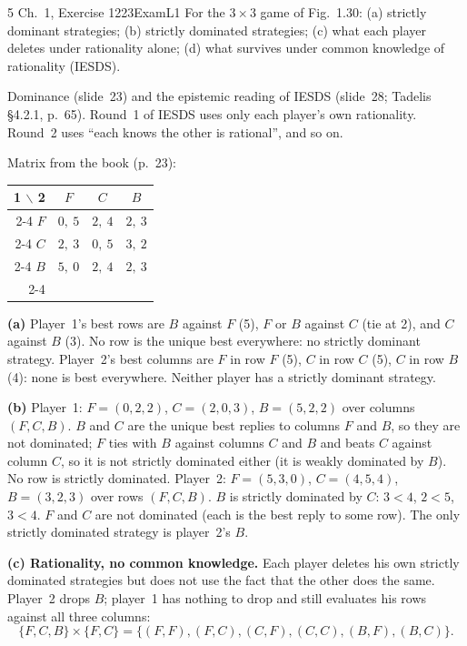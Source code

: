 \begin{exsol}{5}{\MG{} Ch.~1, Exercise 12}{23}{Exam}{L1}
\asked For the $3 \times 3$ game of Fig.~1.30: (a) strictly dominant strategies; (b) strictly
dominated strategies; (c) what each player deletes under rationality alone; (d) what survives
under common knowledge of rationality (IESDS).

\method Dominance (slide~23) and the epistemic reading of IESDS (slide~28; Tadelis \S4.2.1,
p.~65). Round~1 of IESDS uses only each player's own rationality. Round~2 uses ``each knows the
other is rational'', and so on.

\solution
Matrix from the book (p.~23):
\begin{center}
\begin{tabular}{r|c|c|c|}
\multicolumn{1}{r}{1 $\backslash$ 2} & \multicolumn{1}{c}{$F$} & \multicolumn{1}{c}{$C$} & \multicolumn{1}{c}{$B$}\\ \cline{2-4}
$F$ & $0,\ 5$ & $2,\ 4$ & $2,\ 3$ \\ \cline{2-4}
$C$ & $2,\ 3$ & $0,\ 5$ & $3,\ 2$ \\ \cline{2-4}
$B$ & $5,\ 0$ & $2,\ 4$ & $2,\ 3$ \\ \cline{2-4}
\end{tabular}
\end{center}

\textbf{(a)} Player~1's best rows are $B$ against $F$ (5), $F$ or $B$ against $C$ (tie at 2),
and $C$ against $B$ (3). No row is the unique best everywhere: no strictly dominant strategy.
Player~2's best columns are $F$ in row $F$ (5), $C$ in row $C$ (5), $C$ in row $B$ (4): none is
best everywhere. Neither player has a strictly dominant strategy.

\textbf{(b)} Player~1: $F = (0, 2, 2)$, $C = (2, 0, 3)$, $B = (5, 2, 2)$ over columns
$(F, C, B)$. $B$ and $C$ are the unique best replies to columns $F$ and $B$, so they are not
dominated; $F$ ties with $B$ against columns $C$ and $B$ and beats $C$ against column $C$, so it
is not strictly dominated either (it is weakly dominated by $B$). No row is strictly dominated. Player~2:
$F = (5, 3, 0)$, $C = (4, 5, 4)$, $B = (3, 2, 3)$ over rows $(F, C, B)$. $B$ is strictly dominated
by $C$: $3 < 4$, $2 < 5$, $3 < 4$. $F$ and $C$ are not dominated (each is the best reply to some
row). The only strictly dominated strategy is player~2's $B$.

\textbf{(c) Rationality, no common knowledge.} Each player deletes his own strictly dominated
strategies but does not use the fact that the other does the same. Player~2 drops $B$;
player~1 has nothing to drop and still evaluates his rows against all three columns:
\[
  \{F, C, B\} \times \{F, C\} = \{(F,F), (F,C), (C,F), (C,C), (B,F), (B,C)\}.
\]


\end{exsol}

